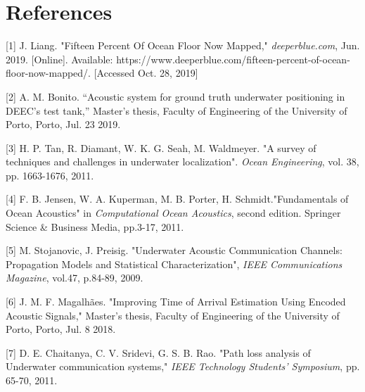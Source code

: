 \chapter{References} \label{chap:concl}




[1] J. Liang. "Fifteen Percent Of Ocean Floor Now Mapped," \textit{deeperblue.com}, Jun. 2019. [Online]. Available: https://www.deeperblue.com/fifteen-percent-of-ocean-floor-now-mapped/. [Accessed Oct. 28, 2019]
\label{r:deeperblue}

[2] A. M. Bonito. “Acoustic system for ground truth underwater positioning in DEEC’s test tank,” Master’s thesis, Faculty of Engineering of the University of Porto, Porto, Jul. 23 2019.
\label{r:afonso-thesis}

[3] H. P. Tan, R. Diamant, W. K. G. Seah, M. Waldmeyer. "A survey of techniques and challenges in underwater localization". \textit{Ocean Engineering}, vol. 38, pp. 1663-1676, 2011.
\label{r:survey-tech-chall}

[4] F. B. Jensen, W. A. Kuperman, M. B. Porter, H. Schmidt."Fundamentals of Ocean Acoustics" in \textit{Computational Ocean Acoustics}, second edition. Springer Science \& Business Media, pp.3-17, 2011. 
\label{r:ocean-acoust}


[5] M. Stojanovic, J. Preisig. "Underwater Acoustic Communication Channels: Propagation Models and Statistical Characterization", \textit{IEEE Communications Magazine}, vol.47, p.84-89, 2009.
\label{r:commchan}

[6] J. M. F. Magalh\~{a}es. "Improving Time of Arrival Estimation Using Encoded Acoustic Signals," Master’s thesis, Faculty of Engineering of the University of Porto, Porto, Jul. 8 2018.
\label{r:thesis-joao}

[7] D. E. Chaitanya, C. V. Sridevi, G. S. B. Rao. "Path loss analysis of Underwater communication systems," \textit{IEEE Technology Students' Symposium}, pp. 65-70, 2011.
\label{r:pathloss}

